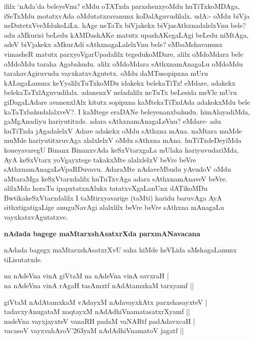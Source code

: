 \noindent
ililx `nAda'da beleyeVnu? eMdu oTATxda parxshenxyoMdu huTiTxkoMDAga, iSeTxMdu motatxvAda oMdutatxravanunx koDalAguvudilalx. udA:- oMdu biVja neDutetxVveMdukoLiLx. hAge neTaTx biVjakekx biVja\-sAthxnadalelxVnu bele? adu aMkurisi beLedu kAMDashAKe matutx upashAKegaLAgi beLedu niMtAga,\- adeV biVjakekx aMkurAdi sAthxnagaLalelxVnu bele? eMbaMshavanunx vimasheR matutx parxyoVgarUpadalilx tegedu\-koMDare, alilx oMdoMdara bele oMdoMdu taraha Agabahudu. alilx oMdoMdara sAthxnamAna\-gaLu oMdoMdu tarahavAgiruvudu vayxkatxvAgutetx. oMdu daMTusopipxna mUru kALugaLanunx keYyalilxTuTx\-koMDu idakekx belekaTiTx! eMdare, adakekx belekaTaTxlAguvudilalx. adanenxV neladalilx neTuTx beLesida meVle mUru giDagaLAdare avanenxlAlx kitutx sopipxna kaMtekaTiTxdAda adakokxMdu bele kaTaTxbahudalalxveV?. I kaMtege eraDANe beleyenanxbahudu. himAlayadiMda, gaMgAnadiyu hariyutitxde. adara sAthxnamAna\-gaLeVnu? eMdare- adu huTiTxda jAgadalelxV Adare adakekx oMdu sAthxna mAna. naMtara muMde muMde hariyutitxruvAga alalxlelxV oMdu sAthxna mAna. huTiTxdeDeyiMda koneyavaregU Binanx BinanxvAda keSxVtarx\-gaLa mUlaka hariyuvudariMda, AyA keSxVtarx yoVgayxtege takakxMte alalxlelxV beVre beVre sAthxnamAna\-gaLeVpaRDu\-vavu. AdaraMte nAdaveMbudu yAvudoV oMdu aMtaraMga keSxVtarxdalilx huTuTxvAga adara sAthxna\-mAnaveV beVre. alilxMda horaTu ipapxtatxnAlukx tatatxvXgaLanUnx dATikoMDu BwtikakeSxVtarxdalilx I taMtirxyavarige (taMti) haridu baruvAga AyA sithxtigatigaLige anuguNavAgi alalxlilx beVre beVre sAthxna mAnagaLu vayxkatx\-vAgutatxve.

{\bigskip
\noindent
{\large\bf nAdada bagege maMtarxshAsatxrXda parxmANavacana}}\label{page159}
\medskip

\noindent
nAdada bagegx maMtarxshAsatxrXvU saha hiMde heVLida aMshagaLanunx tiLisutatxde.

\begin{shloka}
na nAdeVna vinA giVtaM na nAdeVna vinA savxraH |\\\label{159}
na nAdeVna vinA rAgaH tasAmxtf nAdAtamxkaM tarxyamf ||
\end{shloka}

\begin{shloka}
giVtaM nAdAtamxkaM vAdayxM nAdavayxkAtx parxshasayxteV |\\\label{159}
tadavxyAnugataM naqtayxM nAdAdhiVnamatasatxrXyamf ||\\
nadeVna vayxjayxteV vanaRH padaM vaNARtf padAdavxcaH |\\
vacasoV vayxvahAroV\char'263yaM nAdAdhiVnamatoV jagatf ||
\end{shloka}

